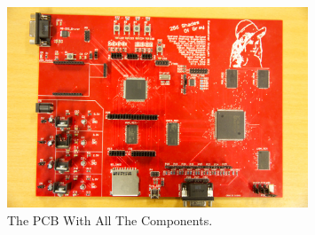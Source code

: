 \begin{figure}[h]
  \centering
  \includegraphics[width=0.8\textwidth]{fig/pcb/pcbwithcompnew.jpeg}
  \caption[The PCB]{The PCB With All The Components.}
  \label{fig:pcb-with-components}
\end{figure}
